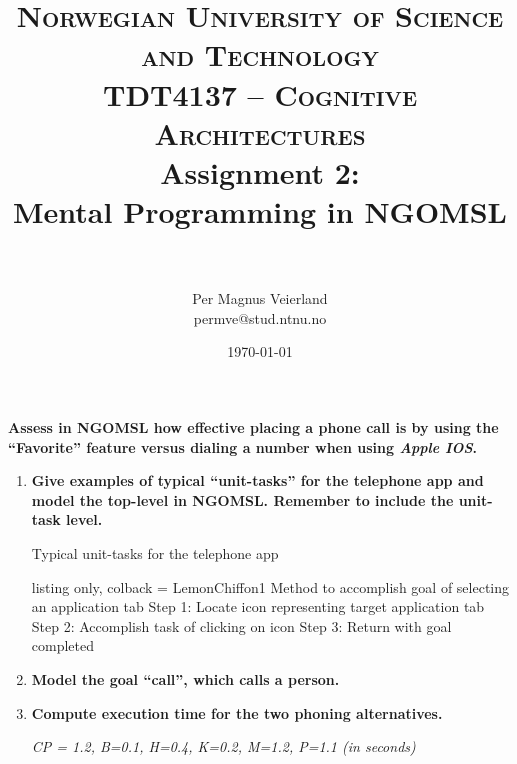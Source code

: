 

\usepackage{tcolorbox}

\title{	
\normalfont \normalsize 
\textsc{Norwegian University of Science and Technology\\TDT4137 -- Cognitive Architectures}
\horrule{0.5pt} \\[0.4cm]
\huge Assignment 2:\\ Mental Programming in NGOMSL\\
\horrule{2pt} \\[0.5cm]
}

\author{Per Magnus Veierland\\permve@stud.ntnu.no}

\date{\normalsize\today}





\maketitle

\textbf{Assess in \ac{NGOMSL} how effective placing a phone call is by using the ``Favorite'' feature versus dialing a number when using \textit{Apple IOS}.}

\begin{enumerate}
\item \textbf{Give examples of typical ``unit-tasks'' for the telephone app and model the top-level in \ac{NGOMSL}. Remember to include the unit-task level.}

Typical unit-tasks for the telephone app 
\begin{tcblisting}{
    listing only,
    colback = LemonChiffon1
}
Method to accomplish goal of selecting an application tab
Step 1: Locate icon representing target application tab
Step 2: Accomplish task of clicking on icon
Step 3: Return with goal completed
\end{tcblisting}



%
%
%

\item \textbf{Model the goal ``call'', which calls a person.}

\item \textbf{Compute execution time for the two phoning alternatives.}

\textit{CP = 1.2, B=0.1, H=0.4, K=0.2, M=1.2, P=1.1 (in seconds)}

\end{enumerate}



